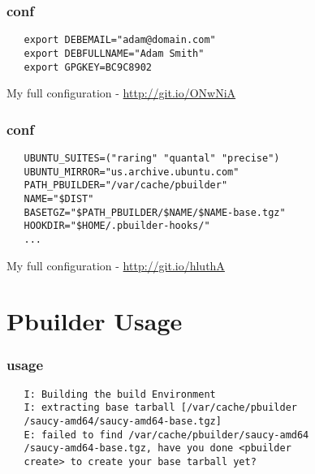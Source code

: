 \documentclass[dvipsnames]{beamer}
\begin{document}
\begin{frame}[fragile]
  \frametitle{conf}
  \begin{center}
  \end{center}
\begin{verbatim}
   export DEBEMAIL="adam@domain.com"
   export DEBFULLNAME="Adam Smith"
   export GPGKEY=BC9C8902
\end{verbatim}
  \begin{center}
      {My full configuration -}
      \url{http://git.io/ONwNiA}
  \end{center}
\end{frame}

\begin{frame}[fragile]
  \frametitle{conf}
  \begin{center}
  \end{center}
  \begin{verbatim}
   UBUNTU_SUITES=("raring" "quantal" "precise")
   UBUNTU_MIRROR="us.archive.ubuntu.com"
   PATH_PBUILDER="/var/cache/pbuilder"
   NAME="$DIST"
   BASETGZ="$PATH_PBUILDER/$NAME/$NAME-base.tgz"
   HOOKDIR="$HOME/.pbuilder-hooks/"
   ...
  \end{verbatim}
  \begin{center}
      {My full configuration -}
      \url{http://git.io/hluthA}
  \end{center}
\end{frame}

\section[Usage]{Pbuilder Usage}

\begin{frame}[fragile]
  \frametitle{usage}
  \begin{center}
  \end{center}
  \begin{verbatim}
   I: Building the build Environment
   I: extracting base tarball [/var/cache/pbuilder
   /saucy-amd64/saucy-amd64-base.tgz]
   E: failed to find /var/cache/pbuilder/saucy-amd64
   /saucy-amd64-base.tgz, have you done <pbuilder
   create> to create your base tarball yet?
  \end{verbatim}

  \begin{center}
  \end{center}
\end{frame}
\end{document}
